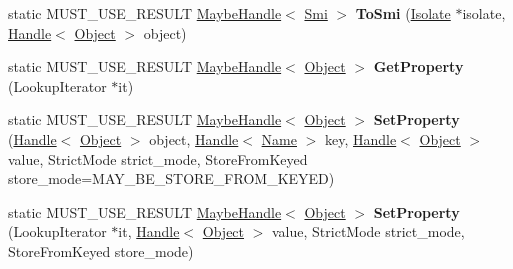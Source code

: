 \begin{DoxyCompactItemize}
\item 
\hypertarget{classv8_1_1internal_1_1_object_a6b7fd336b002c6c888208e21b2a3cd05}{}static M\+U\+S\+T\+\_\+\+U\+S\+E\+\_\+\+R\+E\+S\+U\+L\+T \hyperlink{classv8_1_1internal_1_1_maybe_handle}{Maybe\+Handle}$<$ \hyperlink{classv8_1_1internal_1_1_smi}{Smi} $>$ {\bfseries To\+Smi} (\hyperlink{classv8_1_1internal_1_1_isolate}{Isolate} $\ast$isolate, \hyperlink{classv8_1_1internal_1_1_handle}{Handle}$<$ \hyperlink{classv8_1_1internal_1_1_object}{Object} $>$ object)\label{classv8_1_1internal_1_1_object_a6b7fd336b002c6c888208e21b2a3cd05}

\item 
\hypertarget{classv8_1_1internal_1_1_object_a475153ada85d59ad0e0705feb6870345}{}static M\+U\+S\+T\+\_\+\+U\+S\+E\+\_\+\+R\+E\+S\+U\+L\+T \hyperlink{classv8_1_1internal_1_1_maybe_handle}{Maybe\+Handle}$<$ \hyperlink{classv8_1_1internal_1_1_object}{Object} $>$ {\bfseries Get\+Property} (Lookup\+Iterator $\ast$it)\label{classv8_1_1internal_1_1_object_a475153ada85d59ad0e0705feb6870345}

\item 
\hypertarget{classv8_1_1internal_1_1_object_af5dd450be132298c0d31afdcd792d7b6}{}static M\+U\+S\+T\+\_\+\+U\+S\+E\+\_\+\+R\+E\+S\+U\+L\+T \hyperlink{classv8_1_1internal_1_1_maybe_handle}{Maybe\+Handle}$<$ \hyperlink{classv8_1_1internal_1_1_object}{Object} $>$ {\bfseries Set\+Property} (\hyperlink{classv8_1_1internal_1_1_handle}{Handle}$<$ \hyperlink{classv8_1_1internal_1_1_object}{Object} $>$ object, \hyperlink{classv8_1_1internal_1_1_handle}{Handle}$<$ \hyperlink{classv8_1_1internal_1_1_name}{Name} $>$ key, \hyperlink{classv8_1_1internal_1_1_handle}{Handle}$<$ \hyperlink{classv8_1_1internal_1_1_object}{Object} $>$ value, Strict\+Mode strict\+\_\+mode, Store\+From\+Keyed store\+\_\+mode=M\+A\+Y\+\_\+\+B\+E\+\_\+\+S\+T\+O\+R\+E\+\_\+\+F\+R\+O\+M\+\_\+\+K\+E\+Y\+E\+D)\label{classv8_1_1internal_1_1_object_af5dd450be132298c0d31afdcd792d7b6}

\item 
\hypertarget{classv8_1_1internal_1_1_object_aa644703803126865c2e1dee430bf9cec}{}static M\+U\+S\+T\+\_\+\+U\+S\+E\+\_\+\+R\+E\+S\+U\+L\+T \hyperlink{classv8_1_1internal_1_1_maybe_handle}{Maybe\+Handle}$<$ \hyperlink{classv8_1_1internal_1_1_object}{Object} $>$ {\bfseries Set\+Property} (Lookup\+Iterator $\ast$it, \hyperlink{classv8_1_1internal_1_1_handle}{Handle}$<$ \hyperlink{classv8_1_1internal_1_1_object}{Object} $>$ value, Strict\+Mode strict\+\_\+mode, Store\+From\+Keyed store\+\_\+mode)\label{classv8_1_1internal_1_1_object_aa644703803126865c2e1dee430bf9cec}


\end{DoxyCompactItemize}
